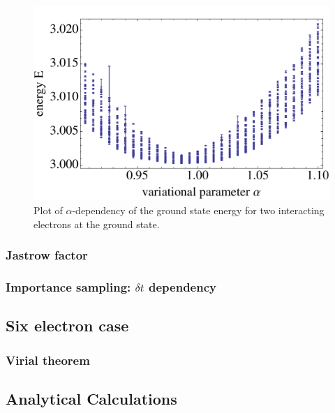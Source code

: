 \begin{figure}[htbp]
    \centering
    \includegraphics[scale=0.6]{2electronalpha}
    \caption{Plot of $\alpha$-dependency of the ground state energy for two interacting electrons at the ground state.}
    \label{fig:2electronalpha}
\end{figure}
\FloatBarrier
\subsubsection{Jastrow factor}
\subsubsection{Importance sampling: $\delta t$ dependency}
\subsection{Six electron case}
\subsubsection{Virial theorem}
\subsection{Analytical Calculations}\label{sec:analytical}